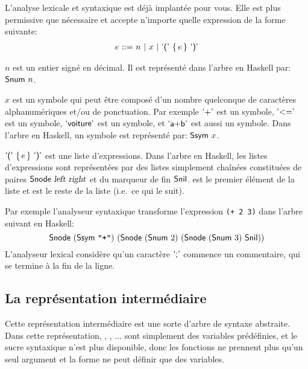 \documentclass{article}
\begin{document}
L'analyse lexicale et syntaxique est déjà implantée pour vous.  Elle est
plus permissive %
que nécessaire et accepte n'importe quelle expression de la
forme suivante:
\begin{displaymath}
  \begin{array}{r@{~}r@{~}l}
    e & ::= & n ~|~ x ~|~
     \punc{(}~\{\,e\,\}%
     ~\punc{)}
  \end{array}
\end{displaymath}
\begin{outitemize}
\item $n$ est un entier signé en décimal.  Il est représenté dans l'arbre en
  Haskell par: $\textsf{Snum}~n$.
\item $x$ est un symbole qui peut être composé d'un nombre quelconque de
  caractères alphanumériques et/ou de ponctuation.  Par exemple $\textsf{`+'}$ est
  un symbole, $\textsf{`<='}$ est un symbole, $\textsf{`voiture'}$ est un symbole,
  et $\textsf{`a+b'}$ est aussi un symbole.  Dans l'arbre en Haskell, un symbole
  est représenté par: $\textsf{Ssym}~x$.
\item $\punc{(}~\{\,e\,\}%
  ~\punc{)}$ est une liste d'expressions.  Dans l'arbre en Haskell, les
  listes d'expressions sont représentées par des listes simplement chaînées
  constituées de paires $\textsf{Snode}~\textsl{left}~\textsl{right}$ et du marqueur de
  fin $\textsf{Snil}$.   est le premier élément de la liste et
   est le reste de la liste (i.e.~ce qui le suit).
\end{outitemize}
Par exemple l'analyseur syntaxique transforme l'expression \texttt{(+ 2 3)}
dans l'arbre suivant en Haskell:
\begin{displaymath}
  \textsf{Snode}~(\textsf{Ssym}~\texttt{"+"})~
  (\textsf{Snode}~(\textsf{Snum}~2)~
  (\textsf{Snode}~(\textsf{Snum}~3)~
  \textsf{Snil}))
\end{displaymath}
L'analyseur lexical considère qu'un caractère $\textsf{`;'}$ commence un
commentaire, qui se termine à la fin de la ligne.

\subsection{La représentation intermédiaire }

Cette représentation intermédiaire est une sorte d'arbre de syntaxe
abstraite.  Dans cette représentation, \kw{+}, \kw{-}, ... sont simplement
des variables prédéfinies, et le sucre syntaxique n'est plus disponible,
donc les fonctions ne prennent plus qu'un seul argument et la forme 
ne peut définir que des variables.
\end{document}

